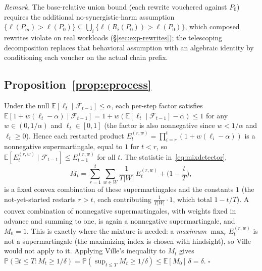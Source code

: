 \documentclass[sigconf,nonacm]{acmart}
\newcommand{\E}{\mathbb{E}}
\newcommand{\Prob}{\mathbb{P}}
\begin{document}
\emph{Remark.} The base-relative union bound (each rewrite vouchered
against $P_0$) requires the additional no-synergistic-harm assumption
$\{\ell(P_m) > \ell(P_0)\} \subseteq \bigcup_i \{\ell(R_i(P_0)) >
\ell(P_0)\}$, which composed rewrites violate on real workloads
(\S\ref{sec:exp-rewrites}); the telescoping decomposition replaces that
behavioral assumption with an algebraic identity by conditioning each
voucher on the actual chain prefix.

\subsection{Proposition~\ref{prop:eprocess}}
Under the null $\E[\ell_t \mid \mathcal{F}_{t-1}] \le \alpha$, each per-step
factor satisfies
$\E[1 + w(\ell_t - \alpha) \mid \mathcal{F}_{t-1}]
= 1 + w(\E[\ell_t \mid \mathcal{F}_{t-1}] - \alpha) \le 1$
for any $w \in (0, 1/\alpha)$ and $\ell_t \in [0,1]$ (the factor is also
nonnegative since $w < 1/\alpha$ and $\ell_t \ge 0$). Hence each restarted
product $E_t^{(r,w)} = \prod_{i=r}^{t}(1 + w(\ell_i - \alpha))$ is a
nonnegative supermartingale, equal to $1$ for $t < r$, so
$\E[E_t^{(r,w)} \mid \mathcal{F}_{t-1}] \le E_{t-1}^{(r,w)}$ for all $t$.
The statistic in~\eqref{eq:mixdetector},
\[
M_t = \sum_{r=1}^{t}\sum_{w \in W}\frac{1}{T|W|}\,E_t^{(r,w)}
      + \Big(1 - \frac{t}{T}\Big),
\]
is a fixed convex combination of these supermartingales and the constants
$1$ (the not-yet-started restarts $r > t$, each contributing
$\tfrac{1}{T|W|}\cdot 1$, which total $1 - t/T$). A convex combination of
nonnegative supermartingales, with weights fixed in advance and summing to
one, is again a nonnegative supermartingale, and $M_0 = 1$. This is exactly
where the mixture is needed: a \emph{maximum} $\max_{r} E_t^{(r,w)}$ is not
a supermartingale (the maximizing index is chosen with hindsight), so Ville
would not apply to it. Applying Ville's inequality \cite{ville1939etude} to
$M_t$ gives $\Prob(\exists t \le T : M_t \ge 1/\delta)
= \Prob(\sup_{t \le T} M_t \ge 1/\delta) \le \E[M_0]\,\delta = \delta$.
\hfill$\square$
\end{document}
